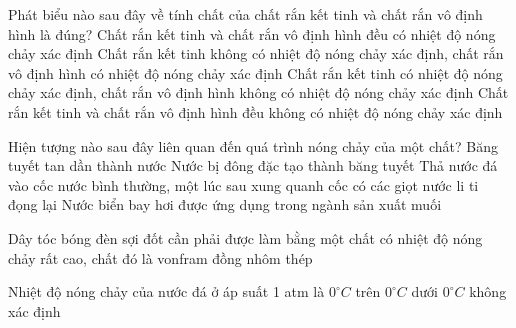 \begin{ex}
	Phát biểu nào sau đây về tính chất của chất rắn kết tinh và chất rắn vô định hình là đúng?
	\choice
	{Chất rắn kết tinh và chất rắn vô định hình đều có nhiệt độ nóng chảy xác định}
	{Chất rắn kết tinh không có nhiệt độ nóng chảy xác định, chất rắn vô định hình có nhiệt độ nóng chảy xác định}
	{\True Chất rắn kết tinh có nhiệt độ nóng chảy xác định, chất rắn vô định hình không có nhiệt độ nóng chảy xác định}
	{Chất rắn kết tinh và chất rắn vô định hình đều không có nhiệt độ nóng chảy xác định}
	\end{ex}



\begin{ex}
	Hiện tượng nào sau đây liên quan đến quá trình nóng chảy của một chất?
	\choice
	{\True Băng tuyết tan dần thành nước}
	{Nước bị đông đặc tạo thành băng tuyết}
	{Thả nước đá vào cốc nước bình thường, một lúc sau xung quanh cốc có các giọt nước li ti đọng lại}
	{Nước biển bay hơi được ứng dụng trong ngành sản xuất muối}
	\end{ex}

\begin{ex}
	Dây tóc bóng đèn sợi đốt cần phải được làm bằng một chất có nhiệt độ nóng chảy rất cao, chất đó là 
	\choice
	{\True vonfram}
	{đồng}
	{nhôm}
	{thép}
	\end{ex}



\begin{ex}
	Nhiệt độ nóng chảy của nước đá ở áp suất 1 atm là
	\choice
	{\True $0^\circ C$}
	{trên $0^\circ C$}
	{dưới $0^\circ C$}
	{không xác định}
	\loigiai{
		
	}
	\end{ex}

